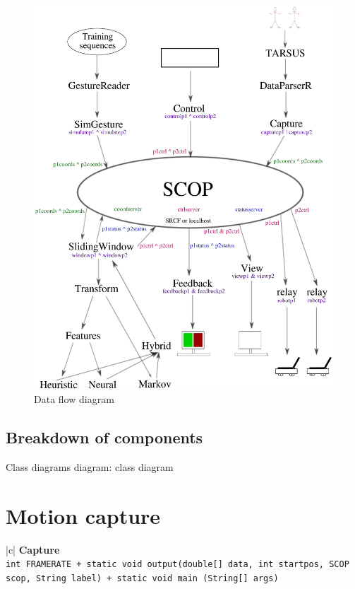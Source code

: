 \documentclass[12pt,a4,notitlepage]{report}
\renewcommand{\_}{\texttt{\symbol{95}}}
\newcommand{\<}{\texttt{\symbol{60}}}
\renewcommand{\>}{\texttt{\symbol{62}}}
\newcommand{\class}[1]{\textbf{#1}}
\newcommand{\variable}[1]{\texttt{#1}}
\begin{document}
{\begin{figure}
\centering
\includegraphics[scale=0.8,angle=0]{diagrams/dataflowdiagram.ps}
\caption{Data flow diagram}
\label{dfd}
\end{figure}

\subsection{Breakdown of components}

Class diagrams
{diagram: class diagram}

\section{Motion capture}

\begin{tabular}{|c|} \hline 
\class{Capture} \\ \hline
{}
{ \variable{int FRAME\_RATE \newline
+ static void output(double[] data, int startpos, SCOP scop, String label) \newline
+ static void main (String[] args)
} } \\ \hline
\end{tabular}

}
\end{document}
